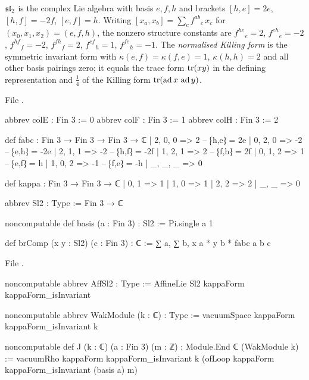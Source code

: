 \begin{definition}\label{l08:def:sl2}
$\mathfrak{sl}_2$ is the complex Lie algebra with basis $e,f,h$ and brackets $[h,e]=2e$, $[h,f]=-2f$,
$[e,f]=h$. Writing $[x_a,x_b] = \sum_c f^{ab}{}_c\,x_c$ for $(x_0,x_1,x_2) = (e,f,h)$, the nonzero
structure constants are $f^{he}{}_e = 2$, $f^{eh}{}_e=-2$, $f^{hf}{}_f=-2$, $f^{fh}{}_f=2$,
$f^{ef}{}_h=1$, $f^{fe}{}_h=-1$. The \emph{normalised Killing form} is the symmetric invariant form with
$\kappa(e,f)=\kappa(f,e)=1$, $\kappa(h,h)=2$ and all other basis pairings zero; it equals the trace
form $\operatorname{tr}(xy)$ in the defining representation and $\frac14$ of the Killing form
$\operatorname{tr}(\operatorname{ad} x\,\operatorname{ad} y)$.
\end{definition}

\noindent File .
\begin{leancode}
abbrev colE : Fin 3 := 0
abbrev colF : Fin 3 := 1
abbrev colH : Fin 3 := 2

def fabc : Fin 3 → Fin 3 → Fin 3 → ℂ
  | 2, 0, 0 => 2    -- ⁅h,e⁆ = 2e
  | 0, 2, 0 => -2   -- ⁅e,h⁆ = -2e
  | 2, 1, 1 => -2   -- ⁅h,f⁆ = -2f
  | 1, 2, 1 => 2    -- ⁅f,h⁆ = 2f
  | 0, 1, 2 => 1    -- ⁅e,f⁆ = h
  | 1, 0, 2 => -1   -- ⁅f,e⁆ = -h
  | _, _, _ => 0

def kappa : Fin 3 → Fin 3 → ℂ
  | 0, 1 => 1
  | 1, 0 => 1
  | 2, 2 => 2
  | _, _ => 0

abbrev Sl2 : Type := Fin 3 → ℂ

noncomputable def basis (a : Fin 3) : Sl2 := Pi.single a 1

def brComp (x y : Sl2) (c : Fin 3) : ℂ := ∑ a, ∑ b, x a * y b * fabc a b c
\end{leancode}
\noindent File .
\begin{leancode}
noncomputable abbrev AffSl2 : Type := AffineLie Sl2 kappaForm kappaForm_isInvariant

noncomputable abbrev WakModule (k : ℂ) : Type :=
  vacuumSpace kappaForm kappaForm_isInvariant k

noncomputable def J (k : ℂ) (a : Fin 3) (m : ℤ) : Module.End ℂ (WakModule k) :=
  vacuumRho kappaForm kappaForm_isInvariant k (ofLoop kappaForm kappaForm_isInvariant (basis a) m)
\end{leancode}

